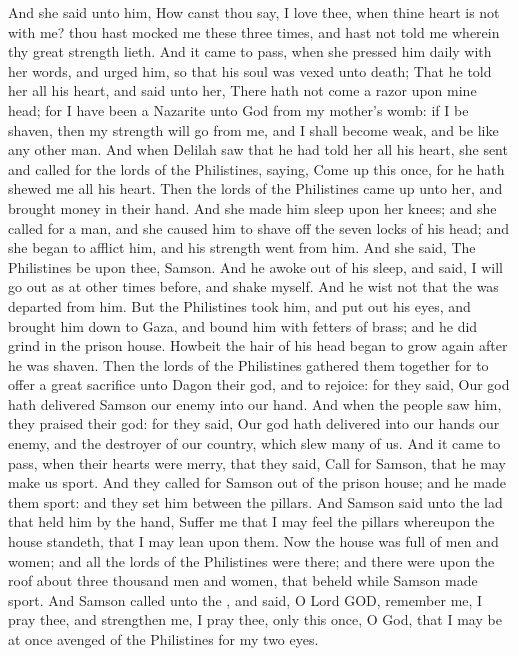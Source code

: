 \begin{biblechapter}
\verse And she said unto him, How canst thou say, I love thee, when thine heart is not with me? thou hast mocked me these three times, and hast not told me wherein thy great strength lieth.
\verse And it came to pass, when she pressed him daily with her words, and urged him, so that his soul was vexed unto death;
\verse That he told her all his heart, and said unto her, There hath not come a razor upon mine head; for I have been a Nazarite unto God from my mother's womb: if I be shaven, then my strength will go from me, and I shall become weak, and be like any other man.
\verse And when Delilah saw that he had told her all his heart, she sent and called for the lords of the Philistines, saying, Come up this once, for he hath shewed me all his heart. Then the lords of the Philistines came up unto her, and brought money in their hand.
\verse And she made him sleep upon her knees; and she called for a man, and she caused him to shave off the seven locks of his head; and she began to afflict him, and his strength went from him.
\verse And she said, The Philistines be upon thee, Samson. And he awoke out of his sleep, and said, I will go out as at other times before, and shake myself. And he wist not that the \LORD was departed from him.
\verse But the Philistines took him, and put out his eyes, and brought him down to Gaza, and bound him with fetters of brass; and he did grind in the prison house.
\verse Howbeit the hair of his head began to grow again after he was shaven.
 Then the lords of the Philistines gathered them together for to offer a great sacrifice unto Dagon their god, and to rejoice: for they said, Our god hath delivered Samson our enemy into our hand.
\verse And when the people saw him, they praised their god: for they said, Our god hath delivered into our hands our enemy, and the destroyer of our country, which slew many of us.
\verse And it came to pass, when their hearts were merry, that they said, Call for Samson, that he may make us sport. And they called for Samson out of the prison house; and he made them sport: and they set him between the pillars.
\verse And Samson said unto the lad that held him by the hand, Suffer me that I may feel the pillars whereupon the house standeth, that I may lean upon them.
\verse Now the house was full of men and women; and all the lords of the Philistines were there; and there were upon the roof about three thousand men and women, that beheld while Samson made sport.
\verse And Samson called unto the \LORD, and said, O Lord GOD, remember me, I pray thee, and strengthen me, I pray thee, only this once, O God, that I may be at once avenged of the Philistines for my two eyes.

\end{biblechapter}
